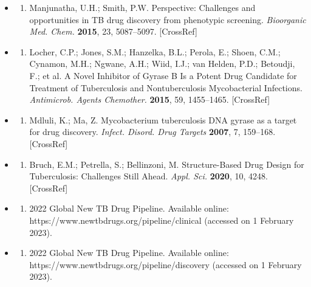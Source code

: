 \documentclass{article}
\begin{document}
\begin{itemize}
\begin{enumerate}
\end{enumerate}

\item \begin{enumerate}
\item 
Manjunatha, U.H.; Smith, P.W. Perspective: Challenges and opportunities in TB drug discovery from phenotypic screening. \textit{Bioorganic Med. Chem.} \textbf{2015}, 23, 5087–5097. [CrossRef]

\end{enumerate}

\item \begin{enumerate}
\item 
Locher, C.P.; Jones, S.M.; Hanzelka, B.L.; Perola, E.; Shoen, C.M.; Cynamon, M.H.; Ngwane, A.H.; Wiid, I.J.; van Helden, P.D.; Betoudji, F.; et al. A Novel Inhibitor of Gyrase B Is a Potent Drug Candidate for Treatment of Tuberculosis and Nontuberculosis Mycobacterial Infections. \textit{Antimicrob. Agents Chemother.} \textbf{2015}, 59, 1455–1465. [CrossRef]

\end{enumerate}

\item \begin{enumerate}
\item 
Mdluli, K.; Ma, Z. Mycobacterium tuberculosis DNA gyrase as a target for drug discovery. \textit{Infect. Disord. Drug Targets} \textbf{2007}, 7, 159–168. [CrossRef]

\end{enumerate}

\item \begin{enumerate}
\item 
Bruch, E.M.; Petrella, S.; Bellinzoni, M. Structure-Based Drug Design for Tuberculosis: Challenges Still Ahead. \textit{Appl. Sci.} \textbf{2020}, 10, 4248. [CrossRef]

\end{enumerate}

\item \begin{enumerate}
\item 
2022 Global New TB Drug Pipeline. Available online: https://www.newtbdrugs.org/pipeline/clinical (accessed on 1 February 2023).

\end{enumerate}

\item \begin{enumerate}
\item 
2022 Global New TB Drug Pipeline. Available online: https://www.newtbdrugs.org/pipeline/discovery (accessed on 1 February 2023).


\end{enumerate}
\end{itemize}
\end{document}
